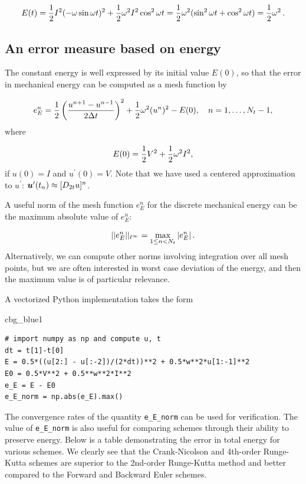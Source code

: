 \documentclass[%
oneside,                 %
final,                   %
10pt]{article}
\newenvironment{_cod_tight}[1]{
   \def\FrameCommand{\colorbox{#1}}
   \FrameRule0.6pt\MakeFramed {\FrameRestore}\vskip3mm}
   {\vskip0mm\endMakeFramed}
\newenvironment{cod}[1]{
\bgroup\rmfamily
\fboxsep=0mm\relax
\begin{_cod_tight}{#1}
\list{}{\parsep=-2mm\parskip=0mm\topsep=0pt\leftmargin=2mm
\rightmargin=2\leftmargin\leftmargin=4pt\relax}
\item\relax}
{\endlist\end{_cod_tight}\egroup}
\begin{document}
\[ E(t) = {\half}I^2 (-\omega\sin\omega t)^2
+ \half\omega^2 I^2 \cos^2\omega t
= \half\omega^2 (\sin^2\omega t + \cos^2\omega t) = \half\omega^2
\tp
\]


\subsection{An error measure based on energy}

The constant energy is well expressed by its initial value $E(0)$, so that
the error in mechanical energy can be computed as a mesh function by

\begin{equation}
e_E^n = \half\left(\frac{u^{n+1}-u^{n-1}}{2\Delta t}\right)^2
+ \half\omega^2 (u^n)^2 - E(0),
\quad n=1,\ldots,N_t-1,
\end{equation}
where

\[ E(0) = {\half}V^2 + \half\omega^2I^2,\]
if $u(0)=I$ and $u^{\prime}(0)=V$. Note that we have used
a centered approximation to $u^{\prime}$: $\u^{\prime}(t_n)\approx
[D_{2t}u]^n$.

A useful norm of the mesh function $e_E^n$
for the discrete mechanical energy
can be the maximum absolute value of $e_E^n$:

\[ ||e_E^n||_{\ell^\infty} = \max_{1\leq n <N_t} |e_E^n|\tp\]
Alternatively, we can compute other norms involving integration over
all mesh points, but we are often interested in worst case deviation
of the energy, and then the maximum value is of particular relevance.

A vectorized Python implementation takes the form

\begin{cod}{cbg_blue1}\begin{Verbatim}[numbers=none,fontsize=\fontsize{9pt}{9pt},baselinestretch=0.95,xleftmargin=2mm]
# import numpy as np and compute u, t
dt = t[1]-t[0]
E = 0.5*((u[2:] - u[:-2])/(2*dt))**2 + 0.5*w**2*u[1:-1]**2
E0 = 0.5*V**2 + 0.5**w**2*I**2
e_E = E - E0
e_E_norm = np.abs(e_E).max()
\end{Verbatim}
\end{cod}
\noindent

The convergence rates of the quantity \Verb!e_E_norm! can be used for verification.
The value of \Verb!e_E_norm! is also useful for comparing schemes
through their ability to preserve energy. Below is a table demonstrating
the error in total energy for various schemes. We clearly see that
the Crank-Nicolson and 4th-order Runge-Kutta schemes are superior to
the 2nd-order Runge-Kutta method and better compared to the Forward
and Backward Euler schemes.
\end{document}
